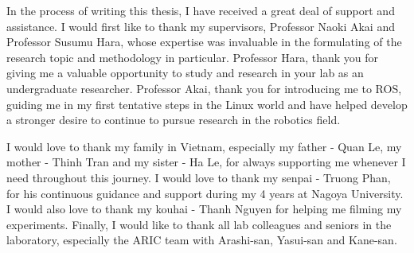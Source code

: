 
In the process of writing this thesis, I have received a great deal of support and assistance.
I would first like to thank my supervisors, Professor Naoki Akai and Professor Susumu Hara,
whose expertise was invaluable in the formulating of the research topic and methodology
in particular. Professor Hara, thank you for giving me a valuable opportunity to study and research in your lab as an undergraduate researcher. Professor Akai, thank you for introducing me to ROS, guiding me in my first tentative steps in the Linux world and have helped develop a stronger desire to continue to pursue research in the robotics field.

I would love to thank my family in Vietnam, especially my father - Quan Le, my mother - Thinh Tran and my sister - Ha Le, for always supporting 
me whenever I need throughout this journey. 
I would love to thank my senpai - Truong Phan, 
for his continuous guidance and support during my 4 years at 
Nagoya University. I would also love to thank my kouhai - 
Thanh Nguyen for helping me filming my experiments. Finally, 
I would like to thank all lab colleagues and seniors in the 
laboratory, especially the ARIC team with Arashi-san, Yasui-san and Kane-san.
